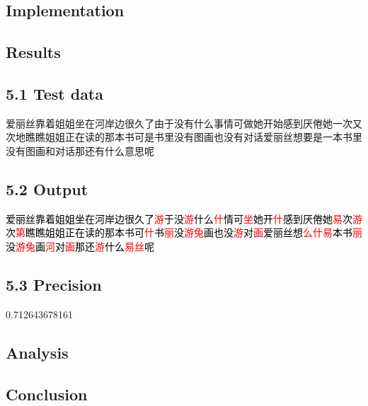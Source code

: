 \documentclass[11pt, twocolumn]{article}
\makeatletter
\newenvironment{problem x}{\@startsection
       {section}
       {1}
       {-.2em}
       {-3.5ex plus -1ex minus -.2ex}
       {2.3ex plus .2ex}
       {\pagebreak[3] %
       \large\bf\noindent{Problem }
       }
       }
       {%
       \begin{center}\large\bf \ldots\ldots\ldots\end{center}}
\makeatother
\begin{document}
\subsection*{Implementation}

\subsection*{Results}
    \subsection*{5.1 Test data}
    \begin{center}
        \begin{CJK}{UTF8}{gbsn}
            爱丽丝靠着姐姐坐在河岸边很久了由于没有什么事情可做她开始感到厌倦她一次又次地瞧瞧姐姐正在读的那本书可是书里没有图画也没有对话爱丽丝想要是一本书里没有图画和对话那还有什么意思呢
        \end{CJK}
    \end{center}

    \subsection*{5.2 Output}
        \begin{center}
        \begin{CJK}{UTF8}{gbsn}
            \textcolor{black}{爱丽丝靠着姐姐坐在河岸边很久了\textcolor{red}{游}于没\textcolor{red}{游}什么\textcolor{red}{什}情可\textcolor{red}{坐}她开\textcolor{red}{什}感到厌倦她\textcolor{red}{易}次\textcolor{red}{游}次\textcolor{red}{第}瞧瞧姐姐正在读的那本书可\textcolor{red}{什}书\textcolor{red}{丽}没\textcolor{red}{游兔}画也没\textcolor{red}{游}对\textcolor{red}{画}爱丽丝想\textcolor{red}{么什易}本书\textcolor{red}{丽}没\textcolor{red}{游兔}画\textcolor{red}{河}对\textcolor{red}{画}那还\textcolor{red}{游}什么\textcolor{red}{易丝}呢}
        \end{CJK}
    \end{center}

    \subsection*{5.3 Precision}
        0.712643678161

\subsection*{Analysis}

\subsection*{Conclusion}
\end{document}
